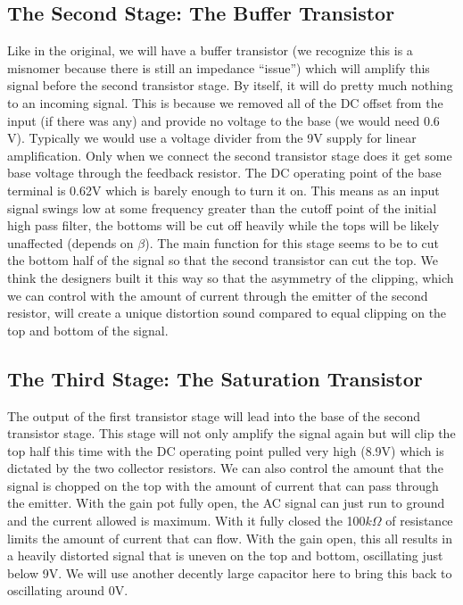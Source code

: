 \documentclass[11pt,twocolumn]{article}
\begin{document}
\subsection{The Second Stage: The Buffer Transistor}

Like in the original, we will have a buffer transistor (we recognize this is a misnomer because there is still an impedance ``issue'') which will amplify this signal before the second transistor stage. By itself, it will do pretty much nothing to an incoming signal. This is because we removed all of the DC offset from the input (if there was any) and provide no voltage to the base (we would need $0.6$V). Typically we would use a voltage divider from the 9V supply for linear amplification. Only when we connect the second transistor stage does it get some base voltage through the feedback resistor. The DC operating point of the base terminal is 0.62V which is barely enough to turn it on. This means as an input signal swings low at some frequency greater than the cutoff point of the initial high pass filter, the bottoms will be cut off heavily while the tops will be likely unaffected (depends on $\beta$). The main function for this stage seems to be to cut the bottom half of the signal so that the second transistor can cut the top. We think the designers built it this way so that the asymmetry of the clipping, which we can control with the amount of current through the emitter of the second resistor, will create a unique distortion sound compared to equal clipping on the top and bottom of the signal.

\subsection{The Third Stage: The Saturation Transistor}

The output of the first transistor stage will lead into the base of the second transistor stage. This stage will not only amplify the signal again but will clip the top half this time with the DC operating point pulled very high (8.9V) which is dictated by the two collector resistors. We can also control the amount that the signal is chopped on the top with the amount of current that can pass through the emitter. With the gain pot fully open, the AC signal can just run to ground and the current allowed is maximum. With it fully closed the 100$k\Omega$ of resistance limits the amount of current that can flow. With the gain open, this all results in a heavily distorted signal that is uneven on the top and bottom, oscillating just below 9V. We will use another decently large capacitor here to bring this back to oscillating around 0V.
\end{document}
